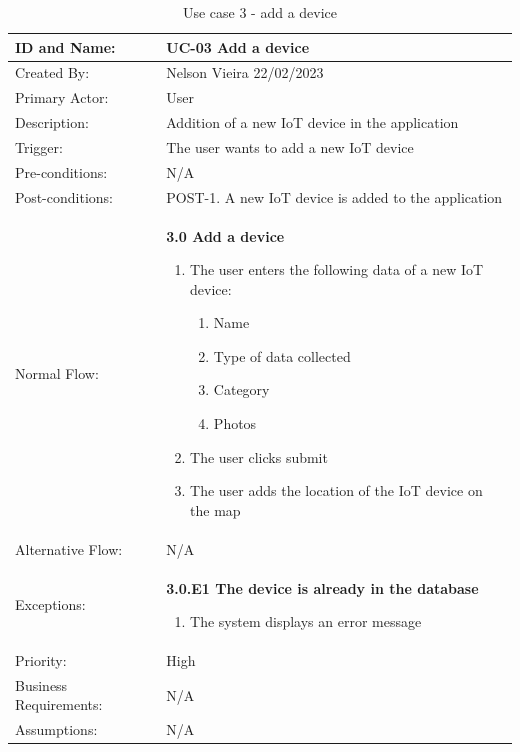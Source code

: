 \documentclass{scrreprt}
\begin{document}
\begin{table}[H]
    \centering
    \begin{adjustbox}{width=1.15\textwidth,center=\textwidth}
        \begin{tabular}{|m{4cm}|m{12cm}|}
            \hline
            ID and Name: & UC-03 Add a device \\
            \hline
            Created By: & Nelson Vieira 22/02/2023 \\
            \hline
            Primary Actor: & User \\
            \hline
            Description: & Addition of a new IoT device in the application \\
            \hline
            Trigger: & The user wants to add a new IoT device \\
            \hline
            Pre-conditions: & N/A \\
            \hline
            Post-conditions: & POST-1. A new IoT device is added to the application \\
            \hline
            Normal Flow: & \textbf{3.0 Add a device}
            \begin{enumerate}
                \item The user enters the following data of a new IoT device:
                \begin{enumerate}
                    \item Name
                    \item Type of data collected
                    \item Category
                    \item Photos
                \end{enumerate}
                \item The user clicks submit
                \item The user adds the location of the IoT device on the map
            \end{enumerate} \\
            \hline
            Alternative Flow: & N/A \\
            \hline
            Exceptions: & \textbf{3.0.E1  The device is already in the database}
            \begin{enumerate}
                \item The system displays an error message
            \end{enumerate} \\
            \hline
            Priority: & High \\
            \hline
            Business Requirements: & N/A \\
            \hline
            Assumptions: & N/A \\
            \hline
        \end{tabular}
    \end{adjustbox}
    \caption{Use case 3 - add a device}
    \label{use case 3}
\end{table}
\end{document}
